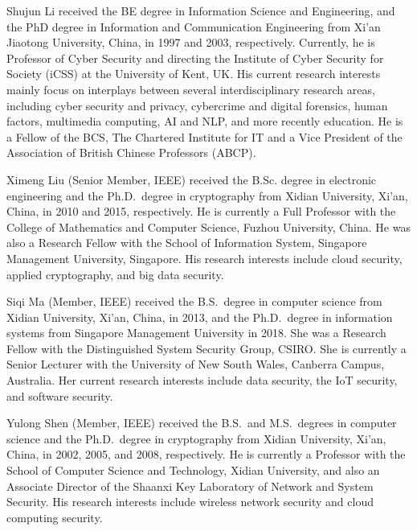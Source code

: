 \documentclass[lettersize,journal]{IEEEtran}
\begin{document}
\begin{IEEEbiography}{Shujun Li} received the BE degree in Information Science and Engineering, and the PhD degree in Information and Communication Engineering from Xi'an Jiaotong University, China, in 1997 and 2003, respectively. Currently, he is Professor of Cyber Security and directing the Institute of Cyber Security for Society (iCSS) at the University of Kent, UK. His current research interests mainly focus on interplays between several interdisciplinary research areas, including cyber security and privacy, cybercrime and digital forensics, human factors, multimedia computing, AI and NLP, and more recently education. He is a Fellow of the BCS, The Chartered Institute for IT and a Vice President of the Association of British Chinese Professors (ABCP).
\end{IEEEbiography}

\begin{IEEEbiography}{Ximeng Liu} (Senior Member, IEEE) received the B.Sc. degree in electronic engineering and the Ph.D.\ degree in cryptography from Xidian University, Xi'an, China, in 2010 and 2015, respectively. He is currently a Full Professor with the College	of Mathematics and Computer Science, Fuzhou	University, China. He was also a Research Fellow with the School of Information System, Singapore Management University, Singapore. His research interests include cloud security, applied cryptography, and big data security.
\end{IEEEbiography}

\begin{IEEEbiography}{Siqi Ma} (Member, IEEE) received the B.S.\ degree in computer science from Xidian University, Xi'an, China, in 2013, and the Ph.D.\ degree in information	systems from Singapore Management University in	2018. She was a Research Fellow with the Distinguished System Security Group, CSIRO. She is currently a Senior Lecturer with the University of New South Wales, Canberra Campus, Australia. Her	current research interests include data security, the IoT security, and software security.
\end{IEEEbiography}

\begin{IEEEbiography}{Yulong Shen} (Member, IEEE) received the B.S.\ and M.S.\ degrees in computer science and the Ph.D.\ degree in cryptography from Xidian University, Xi'an, China, in 2002, 2005, and 2008, respectively. He is currently a Professor with the School of Computer Science and Technology, Xidian University, and also an Associate Director of the Shaanxi Key Laboratory of Network and System Security. His research interests include wireless network security and cloud computing security.
\end{IEEEbiography}
\clearpage
\end{document}

